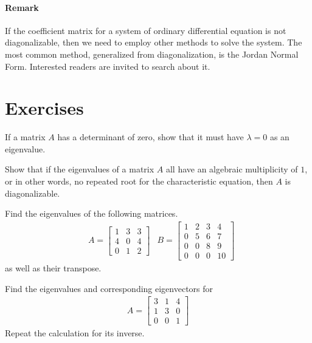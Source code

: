 \paragraph{Remark} If the coefficient matrix for a system of ordinary differential equation is not diagonalizable, then we need to employ other methods to solve the system. The most common method, generalized from diagonalization, is the Jordan Normal Form. Interested readers are invited to search about it.

\section{Exercises}

\begin{Exercise}
If a matrix $A$ has a determinant of zero, show that it must have $\lambda = 0$ as an eigenvalue.
\end{Exercise}

\begin{Exercise}
Show that if the eigenvalues of a matrix $A$ all have an algebraic multiplicity of $1$, or in other words, no repeated root for the characteristic equation, then $A$ is diagonalizable. 
\end{Exercise}

\begin{Exercise}
Find the eigenvalues of the following matrices.
\begin{align*}
&A =
\begin{bmatrix}
1 & 3 & 3\\
4 & 0 & 4\\
0 & 1 & 2
\end{bmatrix}
&B =
\begin{bmatrix}
1 & 2 & 3 & 4\\
0 & 5 & 6 & 7\\
0 & 0 & 8 & 9\\
0 & 0 & 0 & 10
\end{bmatrix}
\end{align*}
as well as their transpose.
\end{Exercise}

\begin{Exercise}
Find the eigenvalues and corresponding eigenvectors for
\begin{align*}
A =
\begin{bmatrix}
3 & 1 & 4\\
1 & 3 & 0\\
0 & 0 & 1
\end{bmatrix}
\end{align*}
Repeat the calculation for its inverse.
\end{Exercise}

